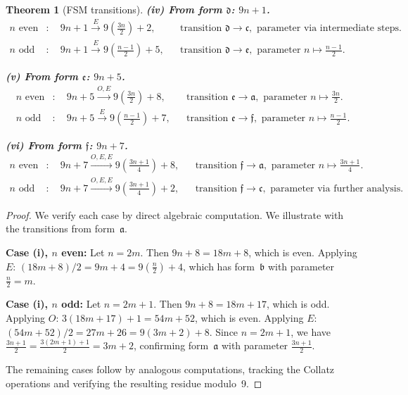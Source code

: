 \documentclass[11pt,a4paper]{article}
\theoremstyle{plain}
\newtheorem{theorem}{Theorem}[section]
\theoremstyle{definition}
\begin{document}
\begin{theorem}[FSM transitions]
  \medskip
  \noindent\textbf{(iv) From form $\mathfrak{d}$: $9n+1$.}
  \begin{align}
    n \text{ even} &: \quad 9n+1 \xrightarrow{E} 9\!\left(\tfrac{3n}{2}\right)+2, && \text{transition } \mathfrak{d} \to \mathfrak{c}, \text{ parameter via intermediate steps.} \label{eq:d_even} \\
    n \text{ odd} &: \quad 9n+1 \xrightarrow{E} 9\!\left(\tfrac{n-1}{2}\right)+5, && \text{transition } \mathfrak{d} \to \mathfrak{e}, \text{ parameter } n \mapsto \tfrac{n-1}{2}. \label{eq:d_odd}
  \end{align}

  \medskip
  \noindent\textbf{(v) From form $\mathfrak{e}$: $9n+5$.}
  \begin{align}
    n \text{ even} &: \quad 9n+5 \xrightarrow{O,E} 9\!\left(\tfrac{3n}{2}\right)+8, && \text{transition } \mathfrak{e} \to \mathfrak{a}, \text{ parameter } n \mapsto \tfrac{3n}{2}. \label{eq:e_even} \\
    n \text{ odd} &: \quad 9n+5 \xrightarrow{E} 9\!\left(\tfrac{n-1}{2}\right)+7, && \text{transition } \mathfrak{e} \to \mathfrak{f}, \text{ parameter } n \mapsto \tfrac{n-1}{2}. \label{eq:e_odd}
  \end{align}

  \medskip
  \noindent\textbf{(vi) From form $\mathfrak{f}$: $9n+7$.}
  \begin{align}
    n \text{ even} &: \quad 9n+7 \xrightarrow{O,E,E} 9\!\left(\tfrac{3n+1}{4}\right)+8, && \text{transition } \mathfrak{f} \to \mathfrak{a}, \text{ parameter } n \mapsto \tfrac{3n+1}{4}. \label{eq:f_even} \\
    n \text{ odd} &: \quad 9n+7 \xrightarrow{O,E,E} 9\!\left(\tfrac{3n+1}{4}\right)+2, && \text{transition } \mathfrak{f} \to \mathfrak{c}, \text{ parameter via further analysis.} \label{eq:f_odd}
  \end{align}
\end{theorem}

\begin{proof}
  We verify each case by direct algebraic computation. We illustrate with the transitions from form~$\mathfrak{a}$.

  \textbf{Case (i), $n$ even:} Let $n = 2m$. Then $9n+8 = 18m+8$, which is even. Applying $E$: $(18m+8)/2 = 9m+4 = 9(\tfrac{n}{2})+4$, which has form~$\mathfrak{b}$ with parameter $\tfrac{n}{2} = m$.

  \textbf{Case (i), $n$ odd:} Let $n = 2m+1$. Then $9n+8 = 18m+17$, which is odd. Applying $O$: $3(18m+17)+1 = 54m+52$, which is even. Applying $E$: $(54m+52)/2 = 27m+26 = 9(3m+2)+8$. Since $n = 2m+1$, we have $\tfrac{3n+1}{2} = \tfrac{3(2m+1)+1}{2} = 3m+2$, confirming form~$\mathfrak{a}$ with parameter $\tfrac{3n+1}{2}$.

  The remaining cases follow by analogous computations, tracking the Collatz operations and verifying the resulting residue modulo~9.
\end{proof}
\end{document}
